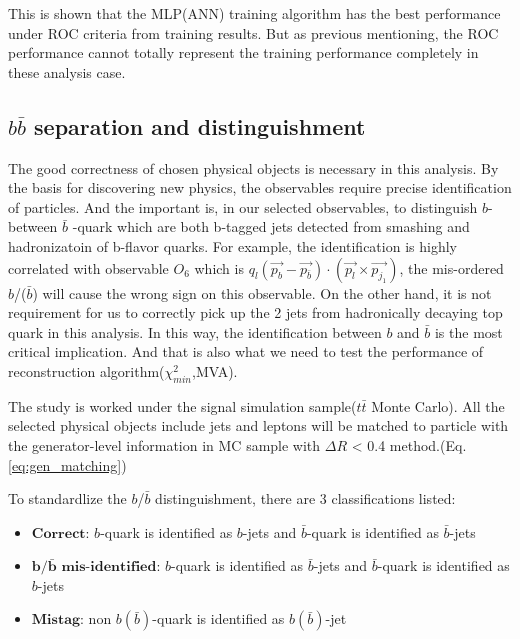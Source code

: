 			This is shown that the MLP(ANN) training algorithm has the best performance under ROC criteria from training results. But as previous mentioning, the ROC performance cannot totally represent the training performance completely in these analysis case.

	\subsection{$b\bar{b}$ separation and distinguishment}
	\label{ssec:bbsep}

		The good correctness of chosen physical objects is necessary in this analysis. By the basis for discovering new physics, the observables require precise identification of particles. And the important is, in our selected observables, to distinguish $b$- between $\bar{b}$ -quark which are both b-tagged jets detected from smashing and hadronizatoin of b-flavor quarks. For example, the identification is highly correlated with observable $O_{6}$ which is $q_{l}(\vec{p_{b}}-\vec{p_{\bar{b}}})\cdot(\vec{p_{l}}\times\vec{p_{j_{1}}})$, the mis-ordered $b$/($\bar{b}$) will cause the wrong sign on this observable. On the other hand, it is not requirement for us to correctly pick up the 2 jets from hadronically decaying top quark in this analysis. In this way, the identification between $b$ and $\bar{b}$ is the most critical implication. And that is also what we need to test the performance of reconstruction algorithm($\chi^2_{min}$,MVA). 

		The study is worked under the signal simulation sample($t$$\bar{t}$ Monte Carlo). All the selected physical objects include jets and leptons will be matched to particle with the generator-level information in MC sample with $\Delta R$ < 0.4 method.(Eq.\ref{eq:gen_matching})

		To standardlize the $b$/$\bar{b}$ distinguishment, there are 3 classifications listed:
		\begin{itemize}
  		\item $\textbf{Correct}$: $b$-quark is identified as $b$-jets and $\bar{b}$-quark is identified as $\bar{b}$-jets
  		\item $\textbf{b/}$$\bar{\textbf{b}}$ $\textbf{mis-identified}$: $b$-quark is identified as $\bar{b}$-jets and $\bar{b}$-quark is identified as $b$-jets
  		\item $\textbf{Mistag}$: non $b$$(\bar{b})$-quark is identified as $b$$(\bar{b})$-jet
		\end{itemize}

